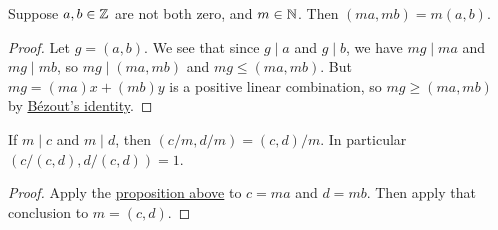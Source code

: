 \begin{proposition}\label{prop:gcd-mult}
    Suppose \(a,b \in \mathbb{Z}\) are not both zero, and \(m \in \mathbb{N}\).
    Then \((ma,mb) = m(a,b)\).
\end{proposition}
\begin{proof}
    Let \(g = (a,b)\).
    We see that since \(g \mid a\) and \(g \mid b\),
    we have \(mg \mid ma\) and \(mg \mid mb\),
    so \(mg \mid (ma,mb)\) and \(mg \leq (ma,mb)\).
    But \(mg = (ma)x + (mb)y\) is a positive linear combination,
    so \(mg \geq (ma,mb)\) by \hyperref[thm:bezout]{B\'ezout's identity}.
\end{proof}
\begin{corollary}
    If \(m \mid c\) and \(m \mid d\), then \((c/m,d/m) = (c,d)/m\).
    In particular \((c/(c,d),d/(c,d)) = 1\).
\end{corollary}
\begin{proof}
    Apply the \hyperref[prop:gcd-mult]{proposition above}
    to \(c = ma\) and \(d = mb\).
    Then apply that conclusion to \(m = (c,d)\).
\end{proof}

